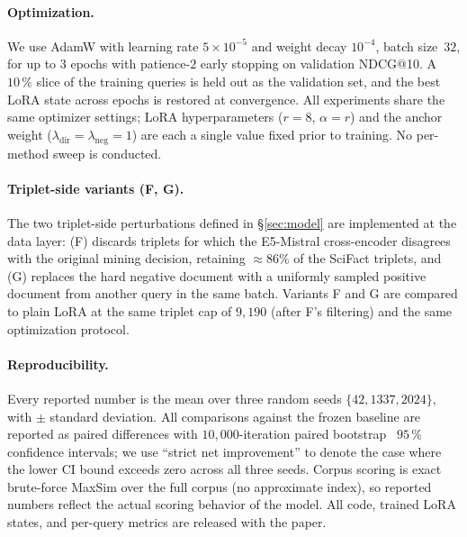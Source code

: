 \paragraph{Optimization.}
We use AdamW with learning rate $5\!\times\!10^{-5}$ and weight decay $10^{-4}$, batch size~$32$, for up to $3$ epochs with patience-$2$ early stopping on validation NDCG@10. A $10\,\%$ slice of the training queries is held out as the validation set, and the best LoRA state across epochs is restored at convergence. All experiments share the same optimizer settings; LoRA hyperparameters ($r{=}8$, $\alpha{=}r$) and the anchor weight ($\lambda_{\text{dir}}{=}\lambda_{\text{neg}}{=}1$) are each a single value fixed prior to training. No per-method sweep is conducted.

\paragraph{Triplet-side variants (F, G).}
The two triplet-side perturbations defined in \S\ref{sec:model} are implemented at the data layer: (F) discards triplets for which the E5-Mistral cross-encoder disagrees with the original mining decision, retaining $\approx\!86\%$ of the SciFact triplets, and (G) replaces the hard negative document with a uniformly sampled positive document from another query in the same batch. Variants F and G are compared to plain LoRA at the same triplet cap of $9{,}190$ (after F's filtering) and the same optimization protocol.

\paragraph{Reproducibility.}
Every reported number is the mean over three random seeds $\{42, 1337, 2024\}$, with $\pm$ standard deviation. All comparisons against the frozen baseline are reported as paired differences with $10{,}000$-iteration paired bootstrap~\cite{efron1979bootstrap} $95\,\%$ confidence intervals; we use ``strict net improvement'' to denote the case where the lower CI bound exceeds zero across all three seeds. Corpus scoring is exact brute-force MaxSim over the full corpus (no approximate index), so reported numbers reflect the actual scoring behavior of the model. All code, trained LoRA states, and per-query metrics are released with the paper.

